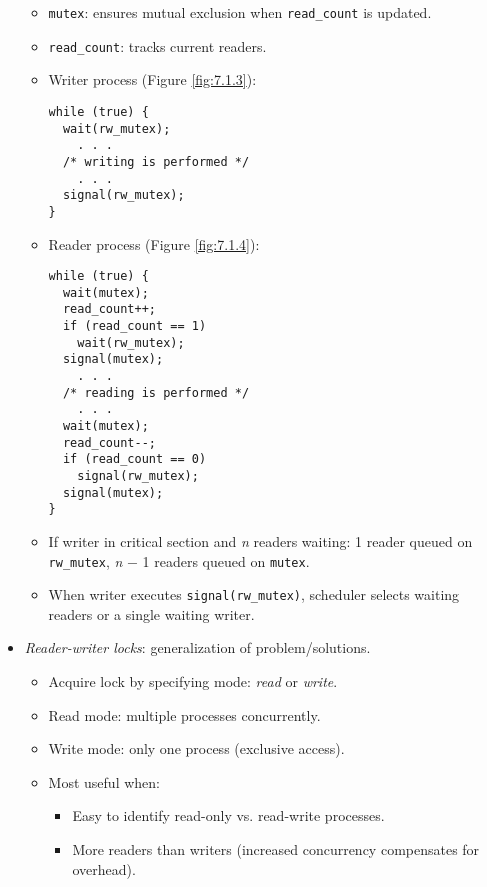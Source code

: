 \begin{itemize}
\begin{itemize}
        \item \texttt{mutex}: ensures mutual exclusion when \texttt{read\_count} is updated.
        \item \texttt{read\_count}: tracks current readers.
        \item Writer process (Figure \ref{fig:7.1.3}):
        \begin{verbatim}
while (true) {
  wait(rw_mutex);
    . . .
  /* writing is performed */
    . . .
  signal(rw_mutex);
}
        \end{verbatim}
        \item Reader process (Figure \ref{fig:7.1.4}):
        \begin{verbatim}
while (true) {
  wait(mutex);
  read_count++;
  if (read_count == 1)
    wait(rw_mutex);
  signal(mutex);
    . . .
  /* reading is performed */
    . . .
  wait(mutex);
  read_count--;
  if (read_count == 0)
    signal(rw_mutex);
  signal(mutex);
}
        \end{verbatim}
        \item If writer in critical section and \textit{n} readers waiting: 1 reader queued on \texttt{rw\_mutex}, \textit{n} $-$ 1 readers queued on \texttt{mutex}.
        \item When writer executes \texttt{signal(rw\_mutex)}, scheduler selects waiting readers or a single waiting writer.
    \end{itemize}
    \item \textit{Reader-writer locks}: generalization of problem/solutions.
    \begin{itemize}
        \item Acquire lock by specifying mode: \textit{read} or \textit{write}.
        \item Read mode: multiple processes concurrently.
        \item Write mode: only one process (exclusive access).
        \item Most useful when:
        \begin{itemize}
            \item Easy to identify read-only vs. read-write processes.
            \item More readers than writers (increased concurrency compensates for overhead).
        \end{itemize}
    \end{itemize}
\end{itemize}

